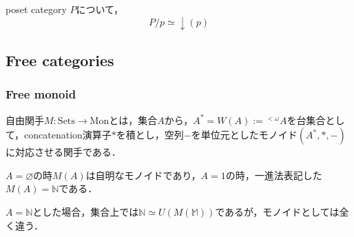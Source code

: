 \documentclass[uplatex, 12pt, dvipdfmx]{jsarticle}
\begin{document}
\begin{proposition*}
    poset category $P$について，
    \[ P/p \simeq \downarrow (p) \]
\end{proposition*}

\subsection{Free categories}

\subsubsection{Free monoid}

\begin{definition*}
    自由関手$M:\mathrm{Sets}\to\mathrm{Mon}$とは，集合$A$から，$A^*=W(A):={}^{<\omega}\!A$を台集合として，concatenation演算子$*$を積とし，空列$-$を単位元としたモノイド$(A^*,*,-)$に対応させる関手である．
\end{definition*}
\begin{remark*}
    $A=\varnothing$の時$M(A)$は自明なモノイドであり，$A=1$の時，一進法表記した$M(A)=\mathbb{N}$である．

    $A=\mathbb{N}$とした場合，集合上では$\mathbb{N}\simeq U(M(\mathbb{M}))$であるが，モノイドとしては全く違う．
\end{remark*}
\end{document}
